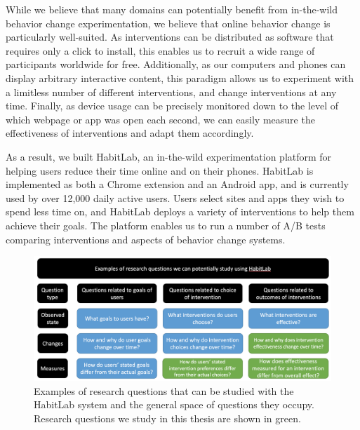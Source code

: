While we believe that many domains can potentially benefit from in-the-wild behavior change experimentation, we believe that online behavior change is particularly well-suited. As interventions can be distributed as software that requires only a click to install, this enables us to recruit a wide range of participants worldwide for free. Additionally, as our computers and phones can display arbitrary interactive content, this paradigm allows us to experiment with a limitless number of different interventions, and change interventions at any time. Finally, as device usage can be precisely monitored down to the level of which webpage or app was open each second, we can easily measure the effectiveness of interventions and adapt them accordingly.

As a result, we built HabitLab, an in-the-wild experimentation platform for helping users reduce their time online and on their phones. HabitLab is implemented as both a Chrome extension and an Android app, and is currently used by over 12,000 daily active users. Users select sites and apps they wish to spend less time on, and HabitLab deploys a variety of interventions to help them achieve their goals. The platform enables us to run a number of A/B tests comparing interventions and aspects of behavior change systems.


\begin{figure}
  \includegraphics[width=\linewidth]{figuresI/researchquestions.png}
  \caption{Examples of research questions that can be studied with the HabitLab system and the general space of questions they occupy. Research questions we study in this thesis are shown in green.}
  \label{fig:researchquestions}
\end{figure}


